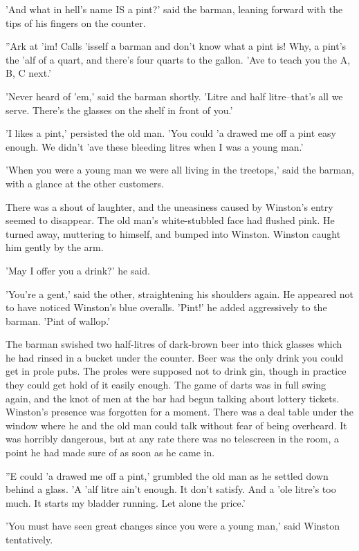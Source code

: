 \documentclass{article}
\begin{document}
'And what in hell's name IS a pint?' said the barman, leaning forward with
the tips of his fingers on the counter.

''Ark at 'im! Calls 'isself a barman and don't know what a pint is! Why,
a pint's the 'alf of a quart, and there's four quarts to the gallon.
'Ave to teach you the A, B, C next.'

'Never heard of 'em,' said the barman shortly. 'Litre and half
litre--that's all we serve. There's the glasses on the shelf in front
of you.'

'I likes a pint,' persisted the old man. 'You could 'a drawed me off a pint
easy enough. We didn't 'ave these bleeding litres when I was a young man.'

'When you were a young man we were all living in the treetops,' said the
barman, with a glance at the other customers.

There was a shout of laughter, and the uneasiness caused by Winston's entry
seemed to disappear. The old man's white-stubbled face had flushed pink. He
turned away, muttering to himself, and bumped into Winston. Winston caught
him gently by the arm.

'May I offer you a drink?' he said.

'You're a gent,' said the other, straightening his shoulders again. He
appeared not to have noticed Winston's blue overalls. 'Pint!' he added
aggressively to the barman. 'Pint of wallop.'

The barman swished two half-litres of dark-brown beer into thick glasses
which he had rinsed in a bucket under the counter. Beer was the only drink
you could get in prole pubs. The proles were supposed not to drink gin,
though in practice they could get hold of it easily enough. The game of
darts was in full swing again, and the knot of men at the bar had begun
talking about lottery tickets. Winston's presence was forgotten for a
moment. There was a deal table under the window where he and the old man
could talk without fear of being overheard. It was horribly dangerous, but
at any rate there was no telescreen in the room, a point he had made sure
of as soon as he came in.

''E could 'a drawed me off a pint,' grumbled the old man as he settled down
behind a glass. 'A 'alf litre ain't enough. It don't satisfy. And a 'ole
litre's too much. It starts my bladder running. Let alone the price.'

'You must have seen great changes since you were a young man,' said
Winston tentatively.
\end{document}

